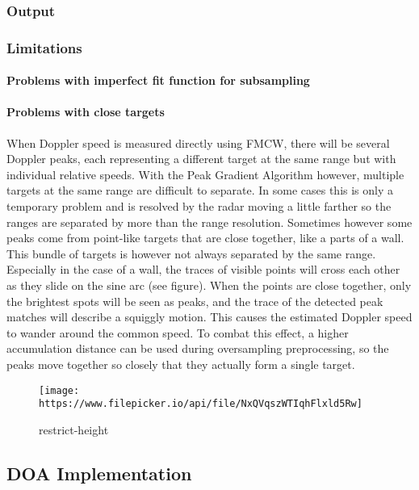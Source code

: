 \subsubsection{Output}\label{output}

\subsubsection{Limitations}\label{limitations-1}

\paragraph{Problems with imperfect fit function for
subsampling}\label{problems-with-imperfect-fit-function-for-subsampling}

\paragraph{Problems with close
targets}\label{problems-with-close-targets}

When Doppler speed is measured directly using FMCW, there will be
several Doppler peaks, each representing a different target at the same
range but with individual relative speeds. With the Peak Gradient
Algorithm however, multiple targets at the same range are difficult to
separate. In some cases this is only a temporary problem and is resolved
by the radar moving a little farther so the ranges are separated by more
than the range resolution. Sometimes however some peaks come from
point-like targets that are close together, like a parts of a wall. This
bundle of targets is however not always separated by the same range.
Especially in the case of a wall, the traces of visible points will
cross each other as they slide on the sine arc (see figure). When the
points are close together, only the brightest spots will be seen as
peaks, and the trace of the detected peak matches will describe a
squiggly motion. This causes the estimated Doppler speed to wander
around the common speed. To combat this effect, a higher accumulation
distance can be used during oversampling preprocessing, so the peaks
move together so closely that they actually form a single target.

\begin{figure}
\centering
\texttt{[image: https://www.filepicker.io/api/file/NxQVqszWTIqhFlxld5Rw]}
\caption{restrict-height}
\end{figure}

\subsection{DOA Implementation}\label{doa-implementation}

